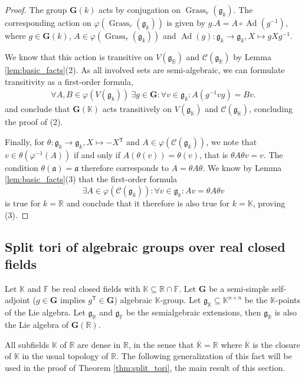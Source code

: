 \documentclass[12pt]{amsart}
\newcommand{\F}{\mathbb{F} }
\newcommand{\R}{\mathbb{R} }
\newcommand{\K}{\mathbb{K}}
\newcommand{\frakg}{\mathfrak{g}}
\newcommand{\fraka}{\mathfrak{a}}
\newcommand{\bG}{\mathbf{G}}
\newcommand{\tran}{{^{\mathsf{T}}\!}}
\numberwithin{equation}{section}
\theoremstyle{remark} %
\begin{document}
\begin{proof}
	The group $\bG(k)$ acts by conjugation on $\operatorname{Grass}_r(\frakg_k)$. The corresponding action on $\varphi(\operatorname{Grass}_r(\frakg_k))$ is given by $g.A = A \circ \operatorname{Ad}(g^{-1}) $, where $g\in \bG(k)$, ${A \in \varphi(\operatorname{Grass}_r(\frakg_k))}$ and $\operatorname{Ad}(g) \colon \frakg_k \to \frakg_k, X \mapsto gXg^{-1}$.
	
	We know that this action is transitive on $V(\frakg_\R)$ and $\mathcal{C}(\frakg_\R)$ by Lemma \ref{lem:basic_facts}(2). As all involved sets are semi-algebraic, we can formulate transitivity as a first-order formula,
	\begin{align*}
		\forall A,B \in \varphi(V(\frakg_k)) \ \exists g \in \bG \colon \forall v \in \frakg_k \colon 
		A(g^{-1}vg) = Bv. 
	\end{align*}
	and conclude that $\bG(\K)$ acts transitively on $V(\frakg_\K)$ and $\mathcal{C}(\frakg_\K)$, concluding the proof of (2).
	
	Finally, for $\theta \colon \frakg_k \to \frakg_k, X \mapsto -X\tran$ and $A \in \varphi(\mathcal{C}(\frakg_k))$, we note that $v \in \theta \left(\varphi^{-1}( A )\right)$ if and only if $A(\theta(v)) = \theta (v)$, that is $\theta A \theta v = v$. The condition $\theta(\fraka) = \fraka$ therefore corresponds to $A =\theta A\theta$. We know by Lemma \ref{lem:basic_facts}(3) that the first-order formula
	$$
	\exists A \in \varphi(\mathcal{C}(\frakg_k) ) \colon \forall v \in \frakg_k \colon Av = \theta A \theta v 
	$$
	is true for $k=\R$ and conclude that it therefore is also true for $k = \K$, proving (3). 
\end{proof}


\subsection{Split tori of algebraic groups over real closed fields}\label{sec:split_tori}

Let $\K$ and $\F$ be real closed fields with $\K \subseteq \R \cap \F$.
Let $\bG$ be a semi-simple self-adjoint ($g \in \bG$ implies $g\tran \in \bG$) algebraic $\K$-group. Let $\frakg_\K \subseteq \K^{n \times n}$ be the $\K$-points of the Lie algebra. Let $\frakg_\R$ and $\frakg_\F$ be the semialgebraic extensions, then $\frakg_\R$ is also the Lie algebra of $\bG(\R)$.

All subfields $\K$ of $\R$ are dense in $\R$, in the sense that $\overline{\K}=\R$ where $\overline{\K}$ is the closure of $\K$ in the usual topology of $\R$. The following generalization of this fact will be used in the proof of Theorem \ref{thm:split_tori}, the main result of this section.
\end{document}
